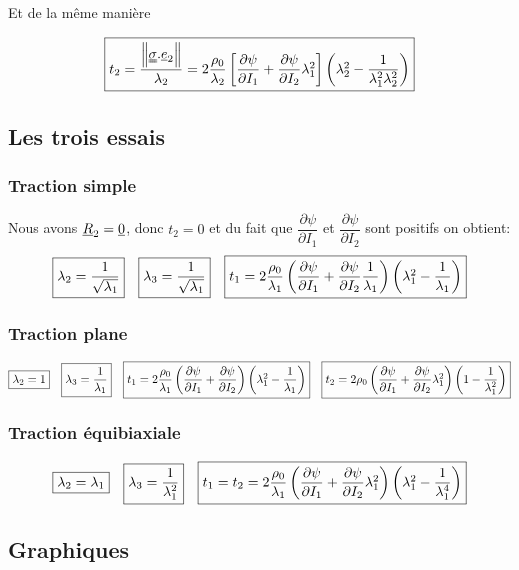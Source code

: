 \documentclass[a4paper,11pt]{article}
\begin{document}
Et de la m\^eme mani\`ere

$$ \fbox{$t_2=\dfrac{\left\|\uuline{\sigma}.\uline{e}_2\right\|}{\lambda_2}= 2\dfrac{\rho_0}{\lambda_2}\left[\dfrac{\partial \psi}{\partial I_1}+\dfrac{\partial \psi}{\partial I_2}\lambda_1^2\right]\left(\lambda_2^2-\dfrac{1}{\lambda_1^2\lambda_2^2} \right)$}
$$

\subsection{Les trois essais}
\subsubsection{Traction simple} Nous avons $\uline{R}_2=\uline{0}$, donc $t_2=0$ et du fait que $\dfrac{\partial \psi}{\partial I_1}$ et $\dfrac{\partial \psi}{\partial I_2}$ sont positifs on obtient: $$\fbox{$\lambda_2=\dfrac{1}{\sqrt{\lambda_1}}$} \quad \fbox{$\lambda_3=\dfrac{1}{\sqrt{\lambda_1}}$} \quad \fbox{$t_1=2\dfrac{\rho_0}{\lambda_1}\left(\dfrac{\partial \psi}{\partial I_1}+\dfrac{\partial \psi}{\partial I_2}\dfrac{1}{\lambda_1} \right)\left(\lambda_1^2-\dfrac{1}{\lambda_1}\right) $}$$

\subsubsection{Traction plane} $$\fbox{$\lambda_2=1$}\quad \fbox{$ \lambda_3=\dfrac{1}{\lambda_1}$}\quad\fbox{$t_1=2\dfrac{\rho_0}{\lambda_1}\left(\dfrac{\partial \psi}{\partial I_1}+\dfrac{\partial \psi}{\partial I_2} \right)\left(\lambda_1^2-\dfrac{1}{\lambda_1}\right)$}\quad\fbox{$t_2=2\rho_0\left(\dfrac{\partial \psi}{\partial I_1}+\dfrac{\partial \psi}{\partial I_2}\lambda_1^2 \right)\left(1-\dfrac{1}{\lambda_1^2}\right)$}$$

\subsubsection{Traction équibiaxiale}$$\fbox{$\lambda_2=\lambda_1$}\quad \fbox{$ \lambda_3=\dfrac{1}{\lambda_1^2}$}\quad\fbox{$t_1=t_2=2\dfrac{\rho_0}{\lambda_1}\left(\dfrac{\partial \psi}{\partial I_1}+\dfrac{\partial \psi}{\partial I_2}\lambda_1^2 \right)\left(\lambda_1^2-\dfrac{1}{\lambda_1^4}\right)$}$$

\newpage

\subsection{Graphiques}
\end{document}
